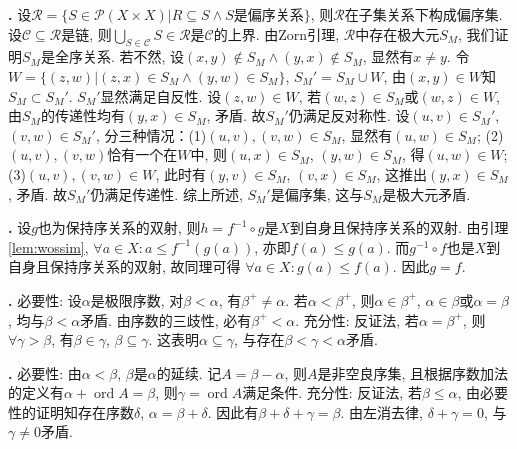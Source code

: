 \par \textbf{\thesolset .} 设$\mathcal{R}=\{S\in \mathcal{P}(X\times X)\vert R\subseteq S \land S\text{是偏序关系}\}$, 则$\mathcal{R}$在子集关系下构成偏序集. 设$\mathcal{C}\subseteq \mathcal{R}$是链, 则$\bigcup_{S\in \mathcal{C}}S\in \mathcal{R}$是$\mathcal{C}$的上界. 由Zorn引理, $\mathcal{R}$中存在极大元$S_M$, 我们证明$S_M$是全序关系. 若不然, 设$(x,y)\notin S_M \land (y,x)\notin S_M$, 显然有$x\neq y$. 令$W=\{(z,w)\vert (z,x)\in S_M \land (y,w)\in S_M\}$, $S_M'=S_M\cup W$, 由$(x,y)\in W$知$S_M\subset S_M'$. $S_M'$显然满足自反性. 设$(z,w)\in W$, 若$(w,z)\in S_M$或$(w,z)\in W$, 由$S_M$的传递性均有$(y,x)\in S_M$, 矛盾. 故$S_M'$仍满足反对称性. 设$(u,v)\in S_M'$, $(v,w)\in S_M'$, 分三种情况：(1)$(u,v),(v,w)\in S_M$, 显然有$(u,w)\in S_M$; (2)$(u,v),(v,w)$恰有一个在$W$中, 则$(u,x)\in S_M$, $(y,w)\in S_M$, 得$(u,w)\in W$; (3)$(u,v),(v,w)\in W$, 此时有$(y,v)\in S_M$, $(v,x)\in S_M$, 这推出$(y,x)\in S_M$, 矛盾. 故$S_M'$仍满足传递性. 综上所述, $S_M'$是偏序集, 这与$S_M$是极大元矛盾. 

\par \textbf{\thesolset .} \cite{NST} 设$g$也为保持序关系的双射, 则$h=f^{-1}\circ g$是$X$到自身且保持序关系的双射. 由引理\ref{lem:wossim}, $\forall a\in X: a\le f^{-1}(g(a))$, 亦即$f(a)\le g(a)$. 而$g^{-1}\circ f$也是$X$到自身且保持序关系的双射, 故同理可得 $\forall a\in X: g(a)\le f(a)$. 因此$g=f$. 

\par \textbf{\thesolset .} 必要性: 设$\alpha$是极限序数, 对$\beta<\alpha$, 有$\beta^+\neq \alpha$. 若$\alpha<\beta^+$, 则$\alpha\in \beta^+$, $\alpha \in \beta$或$\alpha=\beta$, 均与$\beta<\alpha$矛盾. 由序数的三歧性, 必有$\beta^+<\alpha$. 充分性: 反证法, 若$\alpha=\beta^+$, 则$\forall \gamma>\beta$, 有$\beta \in \gamma$, $\beta \subseteq \gamma$. 这表明$\alpha \subseteq \gamma$, 与存在$\beta<\gamma<\alpha$矛盾. 

\par \textbf{\thesolset .} 必要性: 由$\alpha<\beta$, $\beta$是$\alpha$的延续. 记$A=\beta-\alpha$, 则$A$是非空良序集, 且根据序数加法的定义有$\alpha+\operatorname{ord}A=\beta$, 则$\gamma=\operatorname{ord}A$满足条件. 充分性: 反证法, 若$\beta\le \alpha$, 由必要性的证明知存在序数$\delta$, $\alpha=\beta+\delta$. 因此有$\beta+\delta+\gamma=\beta$. 由左消去律, $\delta+\gamma=0$, 与$\gamma\neq 0$矛盾. 